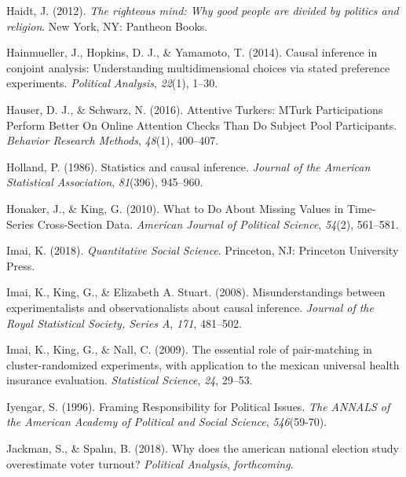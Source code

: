 \documentclass[12pt,econ]{sources/authesis}
\begin{document}
\leavevmode\hypertarget{ref-haidt_2012_righteous}{}%
Haidt, J. (2012). \emph{The righteous mind: Why good people are divided by politics and religion}. New York, NY: Pantheon Books.

\leavevmode\hypertarget{ref-hainmueller_2014_causal}{}%
Hainmueller, J., Hopkins, D. J., \& Yamamoto, T. (2014). Causal inference in conjoint analysis: Understanding multidimensional choices via stated preference experiments. \emph{Political Analysis}, \emph{22}(1), 1--30.

\leavevmode\hypertarget{ref-hauser_attentive_2016}{}%
Hauser, D. J., \& Schwarz, N. (2016). Attentive Turkers: MTurk Participations Perform Better On Online Attention Checks Than Do Subject Pool Participants. \emph{Behavior Research Methods}, \emph{48}(1), 400--407.

\leavevmode\hypertarget{ref-holland_1986_statistics}{}%
Holland, P. (1986). Statistics and causal inference. \emph{Journal of the American Statistical Association}, \emph{81}(396), 945--960.

\leavevmode\hypertarget{ref-honaker_2010_what}{}%
Honaker, J., \& King, G. (2010). What to Do About Missing Values in Time-Series Cross-Section Data. \emph{American Journal of Political Science}, \emph{54}(2), 561--581.

\leavevmode\hypertarget{ref-imai_quantitative_2018}{}%
Imai, K. (2018). \emph{Quantitative Social Science}. Princeton, NJ: Princeton University Press.

\leavevmode\hypertarget{ref-imai_2008_misunderstandings}{}%
Imai, K., King, G., \& Elizabeth A. Stuart. (2008). Misunderstandings between experimentalists and observationalists about causal inference. \emph{Journal of the Royal Statistical Society, Series A}, \emph{171}, 481--502.

\leavevmode\hypertarget{ref-imai_2009_essential}{}%
Imai, K., King, G., \& Nall, C. (2009). The essential role of pair-matching in cluster-randomized experiments, with application to the mexican universal health insurance evaluation. \emph{Statistical Science}, \emph{24}, 29--53.

\leavevmode\hypertarget{ref-iyengar_framing_1996}{}%
Iyengar, S. (1996). Framing Responsibility for Political Issues. \emph{The ANNALS of the American Academy of Political and Social Science}, \emph{546}(59-70).

\leavevmode\hypertarget{ref-jackman_2018_does}{}%
Jackman, S., \& Spahn, B. (2018). Why does the american national election study overestimate voter turnout? \emph{Political Analysis}, \emph{forthcoming}.
\end{document}
